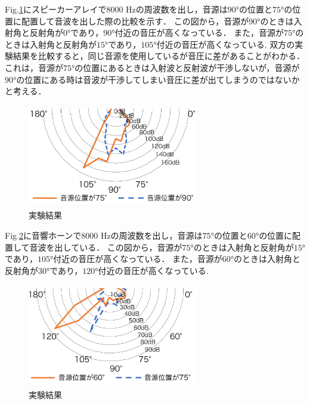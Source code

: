 \documentclass[twocolumn,11pt,a4j]{ltjsarticle}
\begin{document}
\vspace{1ex}
Fig.\ref{fig:結果1}にスピーカーアレイで8000 Hzの周波数を出し，音源は$\ang{90}$の位置と$\ang{75}$の位置に配置して音波を出した際の比較を示す．
この図から，音源が$\ang{90}$のときは入射角と反射角が$\ang{0}$であり，$\ang{90}$付近の音圧が高くなっている．
また，音源が$\ang{75}$のときは入射角と反射角が$\ang{15}$であり，$\ang{105}$付近の音圧が高くなっている.
双方の実験結果を比較すると，同じ音源を使用しているが音圧に差があることがわかる．
これは，音源が$\ang{75}$の位置にあるときは入射波と反射波が干渉しないが，音源が$\ang{90}$の位置にある時は音波が干渉してしまい音圧に差が出てしまうのではないかと考える．

\vspace{1ex}
\begin{figure}[h]
\begin{center}
 \includegraphics[clip,width=75mm,height=45mm]{keltuka.pdf}
\end{center}
 \caption{実験結果}
 \label{fig:結果1}
\end{figure}

\vspace{1ex}
Fig.\ref{fig:結果2}に音響ホーンで8000 Hzの周波数を出し，音源は$\ang{75}$の位置と$\ang{60}$の位置に配置して音波を出している．
この図から，音源が$\ang{75}$のときは入射角と反射角が$\ang{15}$であり，$\ang{105}$付近の音圧が高くなっている．
また，音源が$\ang{60}$のときは入射角と反射角が$\ang{30}$であり，$\ang{120}$付近の音圧が高くなっている.


\vspace{1ex}
\begin{figure}[h]
\begin{center}
 \includegraphics[clip,width=75mm,height=45mm]{keltuka2.pdf}
\end{center}
 \caption{実験結果}
 \label{fig:結果2}
\end{figure}
\end{document}
